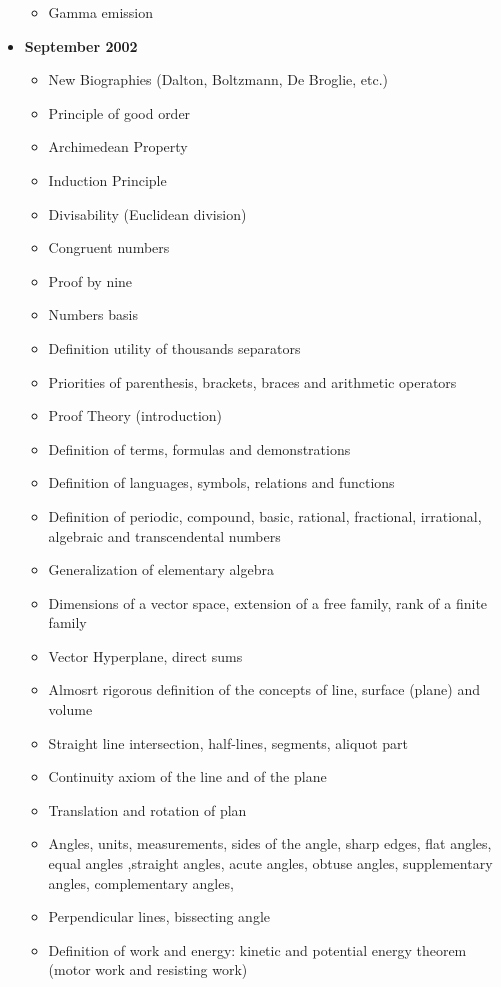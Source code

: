 \documentclass[12pt,a4paper,twoside,openright]{report}
\newcounter{def}
\theoremstyle{definition}
\theoremstyle{itexmp}
\numberwithin{equation}{section}
\begin{document}
\begin{itemize}
\begin{itemize}[noitemsep]
				\item Gamma emission
			\end{itemize}
		\item \textbf{September 2002}	
			\begin{itemize}[noitemsep]
				\item New Biographies (Dalton, Boltzmann, De Broglie, etc.)
				\item Principle of good order
				\item Archimedean Property
				\item Induction Principle
				\item Divisability (Euclidean division)
				\item Congruent numbers
				\item Proof by nine
				\item Numbers basis
				\item Definition utility of thousands separators
				\item Priorities of parenthesis, brackets, braces and arithmetic operators
				\item Proof Theory (introduction)
				\item Definition of terms, formulas and demonstrations
				\item Definition of languages, symbols, relations and functions
				\item Definition of periodic, compound, basic, rational, fractional, irrational, algebraic and transcendental numbers
				\item Generalization of elementary algebra
				\item Dimensions of a vector space, extension of a free family, rank of a finite family
				\item Vector Hyperplane, direct sums
				\item Almosrt rigorous definition of the concepts of line, surface (plane) and volume
				\item Straight line intersection, half-lines, segments, aliquot part
				\item Continuity axiom of the line and of the plane
				\item Translation and rotation of plan
				\item Angles, units, measurements, sides of the angle, sharp edges, flat angles, equal angles ,straight angles, acute angles, obtuse angles, supplementary angles, complementary angles, 
				\item Perpendicular lines, bissecting angle
				\item Definition of work and energy: kinetic and potential energy theorem (motor work and resisting work)

\end{itemize}
\end{itemize}
\end{document}
